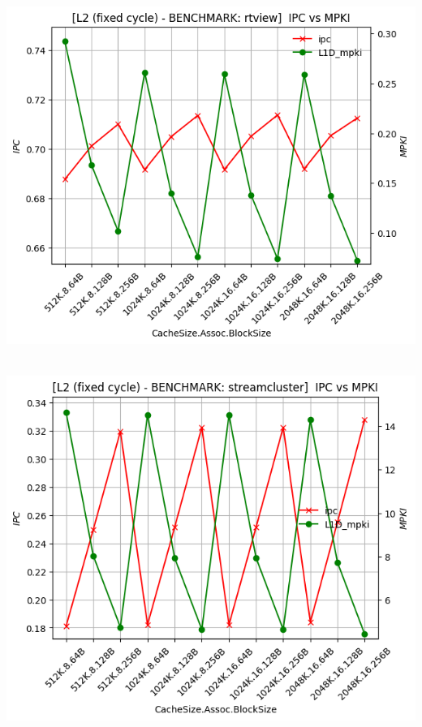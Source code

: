 \begin{minipage}{\textwidth}
    \begin{center}
        \\
        \vspace{3mm}
        \includegraphics[scale=0.70]{graphs/L2/fixed/rtview.png}
        \vspace{6mm}
    \end{center}
\end{minipage}

\begin{minipage}{\textwidth}
    \begin{center}
        \\
        \vspace{3mm}
        \includegraphics[scale=0.70]{graphs/L2/fixed/streamcluster.png}
        \vspace{6mm}
    \end{center}
\end{minipage}

